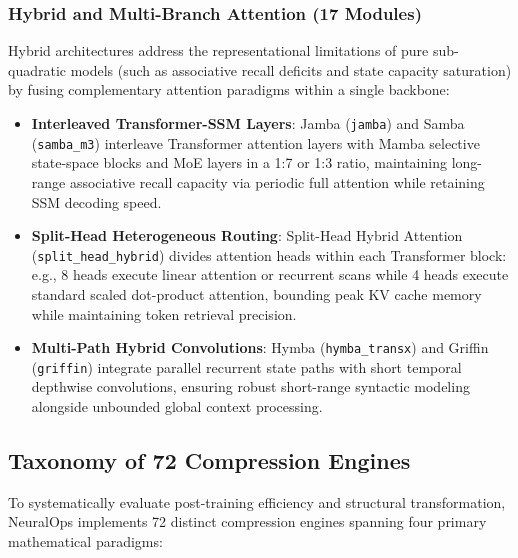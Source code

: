 \documentclass{article}
\begin{document}
\subsubsection{Hybrid and Multi-Branch Attention (17 Modules)}
Hybrid architectures address the representational limitations of pure sub-quadratic models (such as associative recall deficits and state capacity saturation) by fusing complementary attention paradigms within a single backbone:
\begin{itemize}
    \item \textbf{Interleaved Transformer-SSM Layers}: Jamba (\texttt{jamba}) \citep{lieber2024jamba} and Samba (\texttt{samba\_m3}) \citep{ren2024samba} interleave Transformer attention layers with Mamba selective state-space blocks and MoE layers in a 1:7 or 1:3 ratio, maintaining long-range associative recall capacity via periodic full attention while retaining SSM decoding speed.
    \item \textbf{Split-Head Heterogeneous Routing}: Split-Head Hybrid Attention (\texttt{split\_head\_hybrid}) divides attention heads within each Transformer block: e.g., 8 heads execute linear attention or recurrent scans while 4 heads execute standard scaled dot-product attention, bounding peak KV cache memory while maintaining token retrieval precision.
    \item \textbf{Multi-Path Hybrid Convolutions}: Hymba (\texttt{hymba\_transx}) \citep{dong2024hymba} and Griffin (\texttt{griffin}) \citep{de2024griffin} integrate parallel recurrent state paths with short temporal depthwise convolutions, ensuring robust short-range syntactic modeling alongside unbounded global context processing.
\end{itemize}

\subsection{Taxonomy of 72 Compression Engines}
To systematically evaluate post-training efficiency and structural transformation, NeuralOps implements 72 distinct compression engines spanning four primary mathematical paradigms:
\end{document}
